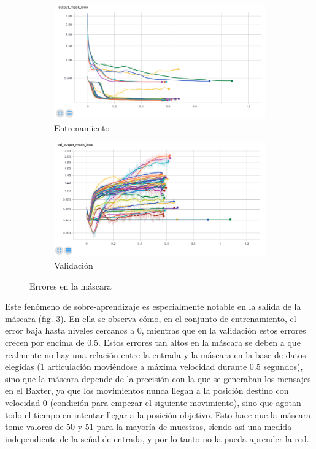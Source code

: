 \begin{figure}
	\begin{subfigure}{0.45\textwidth}
		\centering
		\includegraphics[width=\linewidth]{imagenes/resultados/mask_loss_all.png}
		\caption{Entrenamiento}
		\label{fig:resultados/mask_loss_all}
	\end{subfigure}
	\begin{subfigure}{0.45\textwidth}
		\centering
		\includegraphics[width=\linewidth]{imagenes/resultados/val_mask_loss_all.png}
		\caption{Validación}
		\label{fig:resultados/val_mask_loss_all}
	\end{subfigure}
	\caption{Errores en la máscara}
	\label{fig:resultados/mask_all}
\end{figure}

Este fenómeno de sobre-aprendizaje es especialmente notable en la salida de la máscara (fig. \ref{fig:resultados/mask_all}). En ella se observa cómo, en el conjunto de entrenamiento, el error baja hasta niveles cercanos a 0, mientras que en la validación estos errores crecen por encima de 0.5. Estos errores tan altos en la máscara se deben a que realmente no hay una relación entre la entrada y la máscara en la base de datos elegidas (1 articulación moviéndose a máxima velocidad durante 0.5 segundos), sino que la máscara depende de la precisión con la que se generaban los mensajes en el Baxter, ya que los movimientos nunca llegan a la posición destino con velocidad 0 (condición para empezar el siguiente movimiento), sino que agotan todo el tiempo en intentar llegar a la posición objetivo. Esto hace que la máscara tome valores de 50 y 51 para la mayoría de muestras, siendo así una medida independiente de la señal de entrada, y por lo tanto no la pueda aprender la red.

